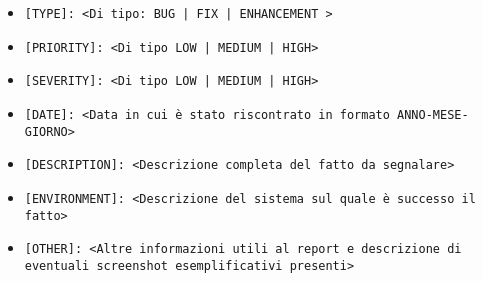 \begin{itemize}
\begin{itemize}
\begin{itemize}
    		\item \texttt{[TYPE]: <Di tipo: BUG | FIX | ENHANCEMENT >}
    		\item \texttt{[PRIORITY]: <Di tipo LOW | MEDIUM | HIGH>}    		
    		\item \texttt{[SEVERITY]: <Di tipo LOW | MEDIUM | HIGH>}    		
    		\item \texttt{[DATE]: <Data in cui è stato riscontrato in formato ANNO-MESE-GIORNO>}
    		\item \texttt{[DESCRIPTION]: <Descrizione completa del fatto da segnalare>}
    		\item \texttt{[ENVIRONMENT]: <Descrizione del sistema sul quale è successo il fatto>}
    		\item \texttt{[OTHER]: <Altre informazioni utili al report e descrizione di eventuali screenshot esemplificativi presenti>}
    	\end{itemize}
    \end{itemize}
\end{itemize}
